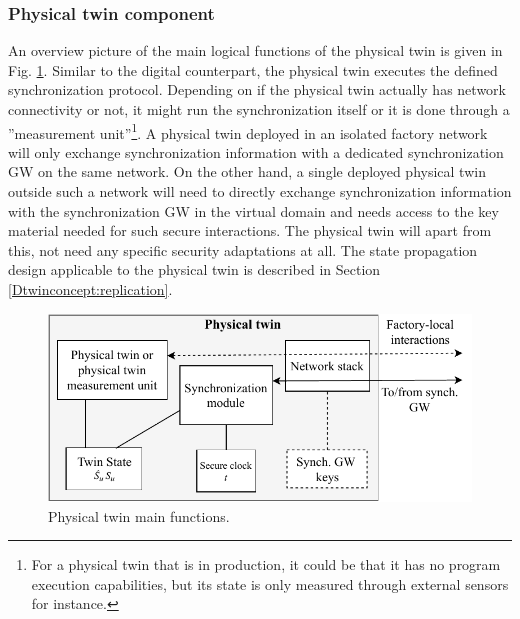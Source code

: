 \subsubsection{Physical twin component}
An overview picture of the main logical functions of the physical twin is given in Fig. \ref{figure:phytwin_security_architecture}. Similar to the digital counterpart, the physical twin executes the defined synchronization protocol. Depending on if the physical twin actually has network connectivity or not, it might run the synchronization itself or it is done through a ''measurement unit''\footnote{For a physical twin that is in production, it could be that it has no program execution capabilities, but its state is only measured through external sensors for instance.}. A physical twin deployed in an isolated factory network will only exchange synchronization information with a dedicated synchronization GW on the same network. On the other hand, a single deployed physical twin outside such a network will need to directly exchange synchronization information with the synchronization GW in the virtual domain and needs access to the key material needed for such secure interactions. The physical twin will apart from this, not need any specific security adaptations at all. The state propagation design applicable to the physical twin is described in Section \ref{Dtwinconcept:replication}.

\begin{figure}[ht]
   \centering
    \includegraphics[scale=0.65]{papers/digital-twin/images/FIG5_TII-19-1326}
    \caption{Physical twin main functions.}
    \label{figure:phytwin_security_architecture}
\end{figure}

